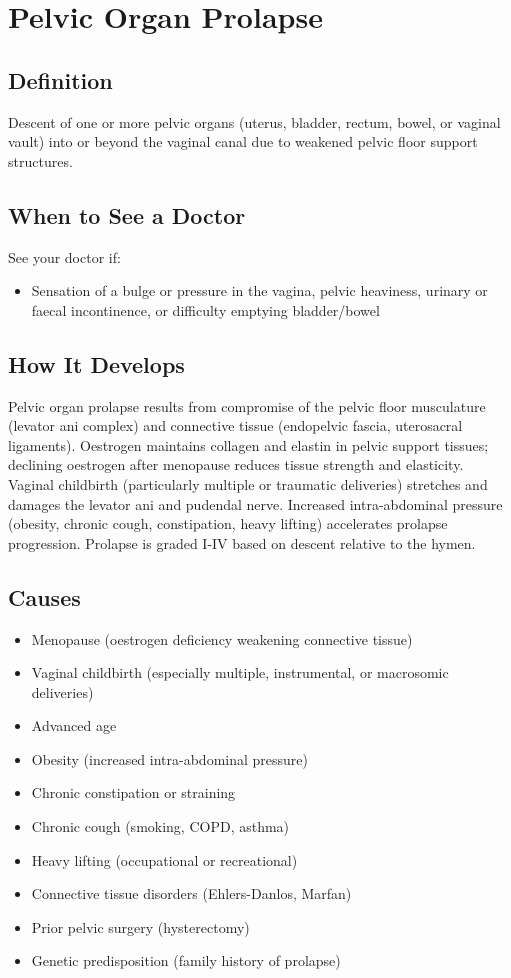 \chapter{Pelvic Organ Prolapse}

\section*{Definition}
Descent of one or more pelvic organs (uterus, bladder, rectum, bowel, or vaginal vault) into or beyond the vaginal canal due to weakened pelvic floor support structures.

\section*{When to See a Doctor}
See your doctor if:
\begin{itemize}
  \item Sensation of a bulge or pressure in the vagina, pelvic heaviness, urinary or faecal incontinence, or difficulty emptying bladder/bowel
\end{itemize}

\section*{How It Develops}
Pelvic organ prolapse results from compromise of the pelvic floor musculature (levator ani complex) and connective tissue (endopelvic fascia, uterosacral ligaments). Oestrogen maintains collagen and elastin in pelvic support tissues; declining oestrogen after menopause reduces tissue strength and elasticity. Vaginal childbirth (particularly multiple or traumatic deliveries) stretches and damages the levator ani and pudendal nerve. Increased intra-abdominal pressure (obesity, chronic cough, constipation, heavy lifting) accelerates prolapse progression. Prolapse is graded I-IV based on descent relative to the hymen.

\section*{Causes}
\begin{itemize}
  \item Menopause (oestrogen deficiency weakening connective tissue)
  \item Vaginal childbirth (especially multiple, instrumental, or macrosomic deliveries)
  \item Advanced age
  \item Obesity (increased intra-abdominal pressure)
  \item Chronic constipation or straining
  \item Chronic cough (smoking, COPD, asthma)
  \item Heavy lifting (occupational or recreational)
  \item Connective tissue disorders (Ehlers-Danlos, Marfan)
  \item Prior pelvic surgery (hysterectomy)
  \item Genetic predisposition (family history of prolapse)
\end{itemize}

